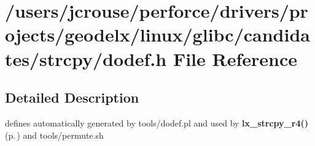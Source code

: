 \section{/users/jcrouse/perforce/drivers/projects/geodelx/linux/glibc/candidates/strcpy/dodef.h File Reference}
\label{dodef_8h}


\subsection{Detailed Description}
 defines automatically generated by tools/dodef.pl and used by {\bf lx\_\-strcpy\_\-r4()} {\rm (p.\,\pageref{strcpy_2def__test_8h_a4})} and tools/permute.sh


